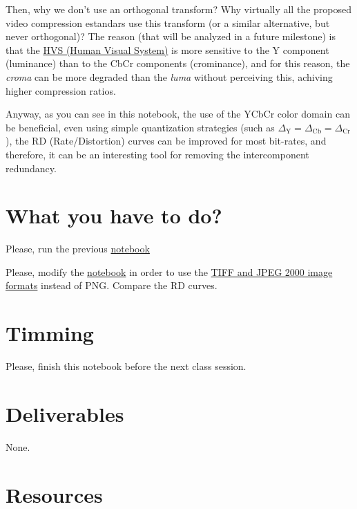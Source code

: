 \begin{comment}
The International Consultative Committee for Radio (CCIR)11 Recommendation 601:
\begin{equation}
\begin{array}
Y ′= 219(+0.299R′ + 0.587G′ + 0.114B′) + 16 \\
CB′= 224(-0.169R′ - 0.331G′ + 0.500B′) + 128 \\
CR′= 224(+0.500R′ - 0.419G′ - 0.081B′) + 128
\end{array}
\end{equation}

0.299*(−0.169) + 0.587*(−0.331) + 0.114*0.500 = -.187828

(-0.169)*0.500 + (-0.331)*(-0.419) + 0.500*(-0.081) = .013689
\end{comment}

Then, why we don't use an orthogonal transform? Why virtually all the
proposed video compression estandars use this transform (or a similar
alternative, but never orthogonal)? The reason (that will be analyzed
in a future milestone) is that the
\href{https://en.wikipedia.org/wiki/Visual_system}{HVS (Human Visual
  System)} is more sensitive to the Y component (luminance) than to
the CbCr components (crominance), and for this reason, the
\emph{croma} can be more degraded than the \emph{luma} without
perceiving this, achiving higher compression ratios.

Anyway, as you can see in this notebook, the use of the YCbCr color
domain can be beneficial, even using simple quantization strategies
(such as $\Delta_\text{Y} = \Delta_\text{Cb} = \Delta_\text{Cr}$), the
RD (Rate/Distortion) curves can be improved for most bit-rates, and
therefore, it can be an interesting tool for removing the
intercomponent redundancy.

\section{What you have to do?}

Please, run the previous \href{}{notebook}

Please, modify the
\href{https://github.com/Sistemas-Multimedia/Sistemas-Multimedia.github.io/blob/master/study_guide/05-quantization/quantize_a_frame.ipynb}{notebook}
in order to use the
\href{https://docs.opencv.org/master/d4/da8/group__imgcodecs.html}{TIFF
  and JPEG 2000 image formats} instead of PNG. Compare the RD curves.

\section{Timming}

Please, finish this notebook before the next class session.

\section{Deliverables}

None.

\section{Resources}


